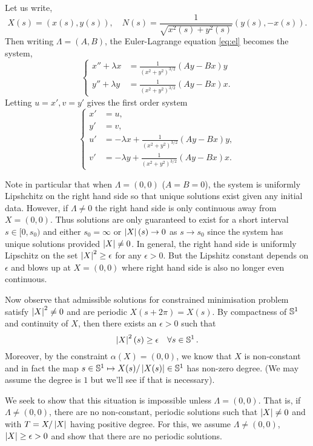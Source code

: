 \documentclass[12pt]{article}
\begin{document}
Let us write,
\[
X(s) = (x(s), y(s)), \quad N(s) = \frac{1}{\sqrt{x^2(s) + y^2(s)}} (y(s), -x(s)).
\]
Then writing \(\Lambda = (A, B)\), the Euler-Lagrange equation \eqref{eq:el} becomes the system,
\[
\begin{cases}
x'' + \lambda x &= \frac{1}{(x^2 + y^2)^{3/2}} (Ay - Bx) y \\
y'' + \lambda y &= \frac{1}{(x^2 + y^2)^{3/2}} (Ay - Bx) x.
\end{cases}
\]
Letting \(u = x', v = y'\) gives the first order system
\begin{equation}
\label{eq:ode}
\begin{cases}
x' &= u, \\
y' &= v, \\
u' &= -\lambda x + \frac{1}{(x^2 + y^2)^{3/2}} (Ay - Bx) y, \\
v' &= -\lambda y + \frac{1}{(x^2 + y^2)^{3/2}} (Ay - Bx) x.
\end{cases}
\end{equation}

Note in particular that when \(\Lambda = (0, 0)\) (\(A = B = 0\)), the system is uniformly Lipshchitz on the right hand side so that unique solutions exist given any initial data. However, if \(\Lambda \ne 0\) the right hand side is only continuous away from \(X = (0, 0)\). Thus solutions are only guaranteed to exist for a short interval \(s \in [0, s_0)\) and either \(s_0 = \infty\) or \(\left|{X}\right|(s) \to 0\) as \(s \to s_0\) since the system has unique solutions provided \(\left|{X}\right| \ne 0\). In general, the right hand side is uniformly Lipschitz on the set \(\left|{X}\right|^2 \geq \epsilon\) for any \(\epsilon > 0\). But the Lipshitz constant depends on \(\epsilon\) and blows up at \(X = (0, 0)\) where right hand side is also no longer even continuous.

Now observe that admissible solutions for constrained minimisation problem satisfy \(\left|{X}\right|^2 \ne 0\) and are periodic \(X(s + 2\pi) = X(s)\). By compactness of \(\operatorname{\mathbb{S}^1}\) and continuity of \(X\), then there exists an \(\epsilon > 0\) such that
\begin{equation}
\label{eq:non_degen}
\left|{X}\right|^2(s) \geq \epsilon \quad \forall s \in \operatorname{\mathbb{S}^1}.
\end{equation}
Moreover, by the constraint \(\alpha(X) = (0, 0)\), we know that \(X\) is non-constant and in fact the map \(s \in \operatorname{\mathbb{S}^1} \mapsto X(s)/\left|{X(s)}\right| \in \operatorname{\mathbb{S}^1}\) has non-zero degree. ({\color{red}We may assume the degree is \(1\) but we'll see if that is necessary}).

We seek to show that this situation is impossible unless \(\Lambda = (0, 0)\). That is, if \(\Lambda \ne (0, 0)\), there are no non-constant, periodic solutions such that \(\left|{X}\right| \ne 0\) and with \(T = X/\left|{X}\right|\) having positive degree. For this, we assume \(\Lambda \ne (0, 0)\), \(\left|{X}\right| \geq \epsilon > 0\) and show that there are no periodic solutions.
\end{document}
